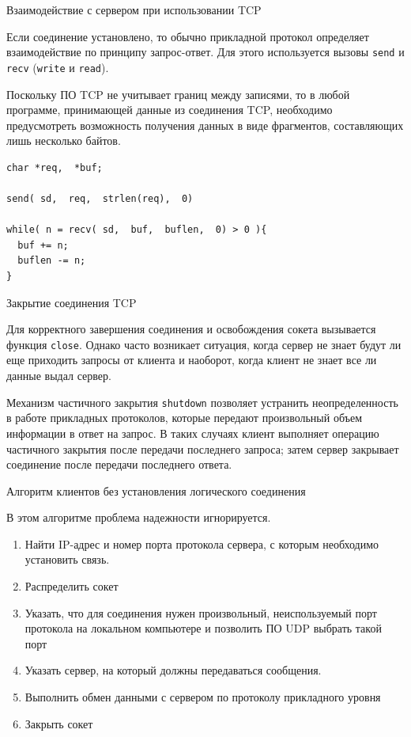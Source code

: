 \begin{frame}[fragile]{Взаимодействие с сервером при использовании TCP}

	Если соединение установлено,  то обычно прикладной протокол определяет взаимодействие по принципу запрос-ответ. Для этого используется вызовы {\tt send} и {\tt recv} ({\tt write} и {\tt read}).

Поскольку ПО TCP не учитывает границ между записями,  то в любой программе,  принимающей данные из соединения TCP,  необходимо предусмотреть возможность получения данных в виде фрагментов,  составляющих лишь несколько байтов.

\scriptsize
	\begin{lstlisting}
char *req,  *buf;

send( sd,  req,  strlen(req),  0)

while( n = recv( sd,  buf,  buflen,  0) > 0 ){
  buf += n;
  buflen -= n;
}
	\end{lstlisting}
\normalsize

\end{frame}

\begin{frame}{Закрытие соединения TCP}

Для корректного завершения соединения и освобождения сокета вызывается функция {\tt close}.
Однако часто возникает ситуация,  когда сервер не знает будут ли еще приходить запросы от 
клиента и наоборот,  когда клиент не знает все ли данные выдал сервер. 

Механизм частичного закрытия {\tt shutdown} позволяет устранить неопределенность в работе прикладных протоколов,
которые передают произвольный объем информации в ответ на запрос. 
В таких случаях клиент выполняет операцию частичного закрытия после передачи последнего запроса; 
затем сервер закрывает соединение после передачи последнего ответа.

\end{frame}

\begin{frame}{Алгоритм клиентов без установления логического соединения}

	В этом алгоритме проблема надежности игнорируется.
	\begin{enumerate}
		\item Найти IP-адрес и номер порта протокола сервера,  с которым необходимо установить связь.
		\item Распределить сокет
		\item Указать,  что для соединения нужен произвольный,  неиспользуемый порт протокола на локальном компьютере и позволить ПО UDP выбрать такой порт
		\item Указать сервер,  на который должны передаваться сообщения.
		\item Выполнить обмен данными с сервером по протоколу прикладного уровня
		\item Закрыть сокет
	\end{enumerate}
\end{frame}


